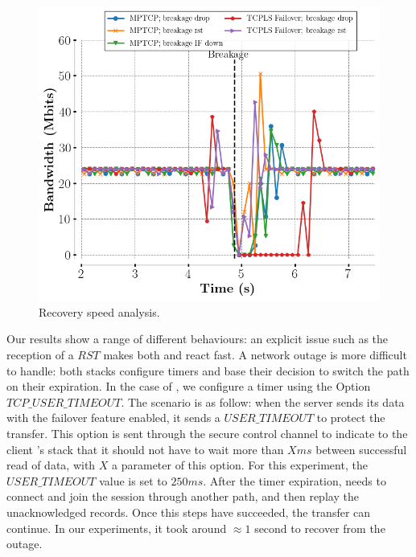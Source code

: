 \begin{figure}[!t] \begin{center}
    \includegraphics[width=\columnwidth]{figures/breakage_analysis.png}
  \end{center} \caption{Recovery speed analysis.} \label{fig:recovery}
\end{figure}

Our results show a range of different behaviours: an explicit issue such as the
reception of a $RST$ makes both \tcpls and \mptcp react fast. A network outage
is more difficult to handle: both stacks configure timers and base their
decision to switch the path on their expiration. In the case of \tcpls, we
configure a timer using the \tcp Option $TCP\_USER\_TIMEOUT$. The scenario is as
follow: when the server sends its data with the failover feature enabled, it
sends a $USER\_TIMEOUT$ to protect the transfer. This option is sent through
the secure control channel to indicate to the client \tcpls's stack that it should
not have to wait more than $X ms$ between successful read of data, with $X$ a
parameter of this option. For this experiment, the $USER\_TIMEOUT$ value is set
to $250ms$. After the timer expiration, \tcpls needs to connect and join the
session through another path, and then replay the unacknowledged records. Once
this steps have succeeded, the transfer can continue. In our experiments, it took
around $\approx 1$ second to recover from the outage.


